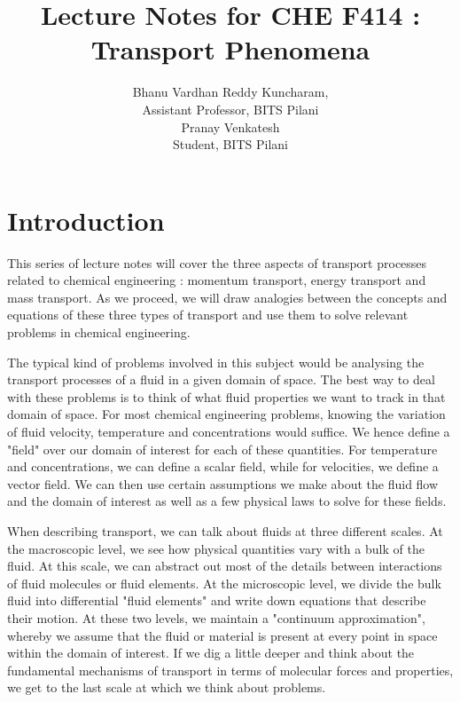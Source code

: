 \documentclass{book}
\title{Lecture Notes for CHE F414 : Transport Phenomena}
\author{Bhanu Vardhan Reddy Kuncharam,\\ Assistant Professor, BITS Pilani \\ Pranay Venkatesh \\ Student, BITS Pilani}
\date{}
\begin{document}
\begin{titlepage}
\maketitle
\end{titlepage}


\tableofcontents

\chapter*{Introduction}

This series of lecture notes will cover the three aspects of transport processes related to chemical engineering : momentum transport, energy transport and mass transport. As we proceed, we will draw analogies between the concepts and equations of these three types of transport and use them to solve relevant problems in chemical engineering.

The typical kind of problems involved in this subject would be analysing the transport processes of a fluid in a given domain of space. The best way to deal with these problems is to think of what fluid properties we want to track in that domain of space. For most chemical engineering problems, knowing the variation of fluid velocity, temperature and concentrations would suffice. We hence define a "field" over our domain of interest for each of these quantities. For temperature and concentrations, we can define a scalar field, while for velocities, we define a vector field. We can then use certain assumptions we make about the fluid flow and the domain of interest as well as a few physical laws to solve for these fields.

When describing transport, we can talk about fluids at three different scales. At the macroscopic level, we see how physical quantities vary with a bulk of the fluid. At this scale, we can abstract out most of the details between interactions of fluid molecules or fluid elements. At the microscopic level,  we divide the bulk fluid into differential "fluid elements" and write down equations that describe their motion. At these two levels, we maintain a "continuum approximation", whereby we assume that the fluid or material is present at every point in space within the domain of interest. If we dig a little deeper and think about the fundamental mechanisms of transport in terms of molecular forces and properties, we get to the last scale at which we think about problems. 





\end{document}
